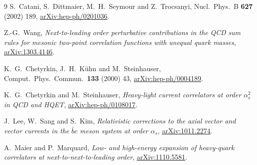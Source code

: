 \documentclass[11pt]{article}
\begin{document}
\begin{thebibliography}{9}
S.~Catani, S.~Dittmaier, M.~H.~Seymour and Z.~Trocsanyi,
Nucl.\ Phys.\ B \textbf{627} (2002) 189,
\href{https://arxiv.org/abs/hep-ph/0201036}{arXiv:hep-ph/0201036}.

Z.-G.~Wang,
\emph{Next-to-leading order perturbative contributions in the QCD sum rules
for mesonic two-point correlation functions with unequal quark masses},
\href{https://arxiv.org/abs/1303.4146}{arXiv:1303.4146}.

K.~G.~Chetyrkin, J.~H.~K\"uhn and M.~Steinhauser,
Comput.\ Phys.\ Commun.\ \textbf{133} (2000) 43,
\href{https://arxiv.org/abs/hep-ph/0004189}{arXiv:hep-ph/0004189}.

K.~G.~Chetyrkin and M.~Steinhauser,
\emph{Heavy-light current correlators at order \(\alpha_s^2\) in QCD and
HQET},
\href{https://arxiv.org/abs/hep-ph/0108017}{arXiv:hep-ph/0108017}.

J.~Lee, W.~Sang and S.~Kim,
\emph{Relativistic corrections to the axial vector and vector currents in
the \(\bar b c\) meson system at order \(\alpha_s\)},
\href{https://arxiv.org/abs/1011.2274}{arXiv:1011.2274}.

A.~Maier and P.~Marquard,
\emph{Low- and high-energy expansion of heavy-quark correlators at
next-to-next-to-leading order},
\href{https://arxiv.org/abs/1110.5581}{arXiv:1110.5581}.
\end{thebibliography}
\end{document}
